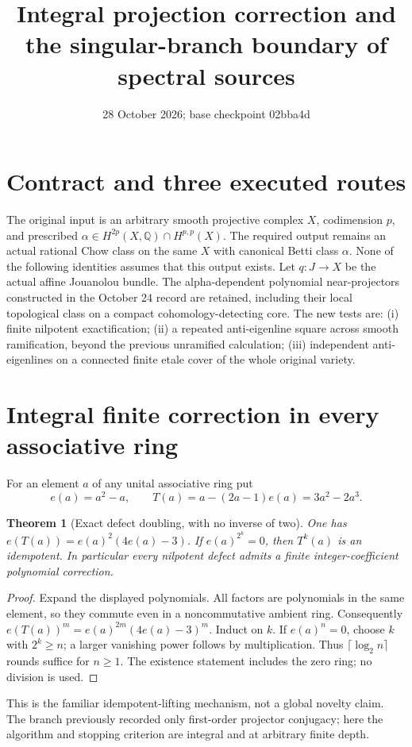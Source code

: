 \documentclass[11pt]{article}
\title{Integral projection correction and the singular-branch boundary of spectral sources}
\date{28 October 2026; base checkpoint 02bba4d}
\newtheorem{theorem}{Theorem}[section]
\begin{document}
\maketitle
\section{Contract and three executed routes}
The original input is an arbitrary smooth projective complex $X$, codimension
$p$, and prescribed $\alpha\in H^{2p}(X,\mathbb Q)\cap H^{p,p}(X)$.
The required output remains an actual rational Chow class on the same $X$
with canonical Betti class $\alpha$. None of the following identities assumes
that this output exists. Let $q:J\to X$ be the actual affine Jouanolou bundle.
The alpha-dependent polynomial near-projectors constructed in the October 24
record are retained, including their local topological class on a compact
cohomology-detecting core. The new tests are: (i) finite nilpotent exactification;
(ii) a repeated anti-eigenline square across smooth ramification, beyond the
previous unramified calculation; (iii) independent anti-eigenlines on a
connected finite etale cover of the whole original variety.

\section{Integral finite correction in every associative ring}
For an element $a$ of any unital associative ring put
\[
 e(a)=a^2-a,\qquad T(a)=a-(2a-1)e(a)=3a^2-2a^3.
\]
\begin{theorem}[Exact defect doubling, with no inverse of two]
One has $e(T(a))=e(a)^2(4e(a)-3)$. If $e(a)^{2^k}=0$, then
$T^k(a)$ is an idempotent. In particular every nilpotent defect admits a finite
integer-coefficient polynomial correction.
\end{theorem}
\begin{proof}
Expand the displayed polynomials. All factors are polynomials in the same
element, so they commute even in a noncommutative ambient ring. Consequently
$e(T(a))^m=e(a)^{2m}(4e(a)-3)^m$. Induct on $k$.
If $e(a)^n=0$, choose $k$ with $2^k\ge n$; a larger vanishing power follows
by multiplication. Thus $\lceil\log_2 n\rceil$ rounds suffice for $n\ge1$.
The existence statement includes the zero ring; no division is used.
\end{proof}
This is the familiar idempotent-lifting mechanism, not a global novelty claim.
The branch previously recorded only first-order projector conjugacy; here the
algorithm and stopping criterion are integral and at arbitrary finite depth.
\end{document}
